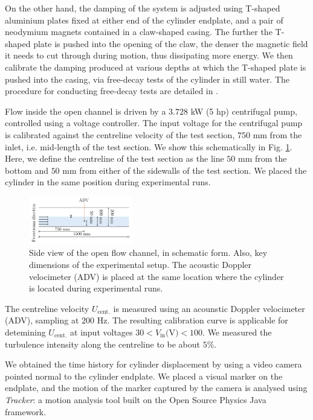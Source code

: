\documentclass[a4paper,fleqn]{cas-sc}
\begin{document}
On the other hand, the damping of the system is adjusted using T-shaped aluminium plates fixed at either end of the cylinder endplate, and a pair of neodymium magnets contained in a claw-shaped casing. The further the T-shaped plate is pushed into the opening of the claw, the denser the magnetic field it needs to cut through during motion, thus dissipating more energy. We then calibrate the damping produced at various depths at which the T-shaped plate is pushed into the casing, via free-decay tests of the cylinder in still water. The procedure for conducting free-decay tests are detailed in \citet{Raghavan2007}.

Flow inside the open channel is driven by a $3.728$ kW (5 hp) centrifugal pump, controlled using a voltage controller. The input voltage for the centrifugal pump is calibrated against the centreline velocity of the test section, $750$ mm from the inlet, i.e. mid-length of the test section. We show this schematically in Fig. \ref{fig:keyDimensions}. Here, we define the centreline of the test section as the line $50$ mm from the bottom and $50$ mm from either of the sidewalls of the test section. We placed the cylinder in the same position during experimental runs.

\begin{figure}
  \centering
  \includegraphics[width=0.4\textwidth]{figs/figure4}
  \caption{Side view of the open flow channel, in schematic form. Also, key dimensions of the experimental setup. The acoustic Doppler velocimeter (ADV) is placed at the same location where the cylinder is located during experimental runs.}
  \label{fig:keyDimensions}
\end{figure}

The centreline velocity $U_{\text{cent.}}$ is measured using an acounstic Doppler velocimeter (ADV), sampling at $200$ Hz. The resulting calibration curve is applicable for detemining $U_{\text{cent.}}$ at input voltages $30 < V_{\text{in}} \text{(V)} < 100$. We measured the turbulence intensity along the centreline to be about $5\%$.

We obtained the time history for cylinder displacement by using a video camera pointed normal to the cylinder endplate. We placed a visual marker on the endplate, and the motion of the marker captured by the camera is analysed using \textit{Tracker}: a motion analysis tool built on the Open Source Physics Java framework.
\end{document}
